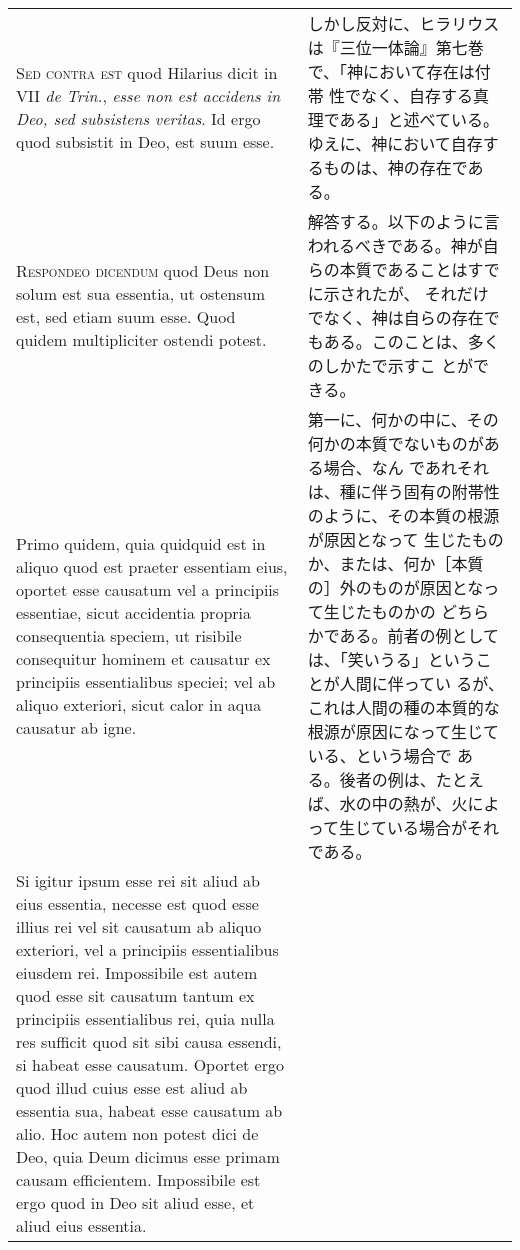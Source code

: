\documentclass[10pt]{jsarticle} %
\begin{document}
\begin{longtable}{p{21em}p{21em}}
\\

\textsc{Sed contra est} quod Hilarius dicit in VII \textit{de Trin.}, \textit{esse non est accidens in Deo, sed subsistens veritas}. 
Id ergo quod subsistit in Deo, est suum esse.

&
しかし反対に、ヒラリウスは『三位一体論』第七巻で、「神において存在は付帯
 性でなく、自存する真理である」と述べている。
ゆえに、神において自存するものは、神の存在である。

\\

\textsc{Respondeo dicendum} quod Deus non solum est sua essentia, ut
 ostensum est, sed etiam suum esse.  Quod quidem multipliciter ostendi
 potest.  

&

解答する。以下のように言われるべきである。神が自らの本質であることはすでに示されたが、
 それだけでなく、神は自らの存在でもある。このことは、多くのしかたで示すこ
 とができる。

\\

Primo quidem, quia quidquid est in aliquo quod est praeter
 essentiam eius, oportet esse causatum vel a principiis essentiae, sicut
 accidentia propria consequentia speciem, ut risibile consequitur
 hominem et causatur ex principiis essentialibus speciei; vel ab aliquo
 exteriori, sicut calor in aqua causatur ab igne.  
&

第一に、何かの中に、その何かの本質でないものがある場合、なん
 であれそれは、種に伴う固有の附帯性のように、その本質の根源が原因となって
 生じたものか、または、何か［本質の］外のものが原因となって生じたものかの
 どちらかである。前者の例としては、「笑いうる」ということが人間に伴ってい
 るが、これは人間の種の本質的な根源が原因になって生じている、という場合で
 ある。後者の例は、たとえば、水の中の熱が、火によって生じている場合がそれ
 である。

\\


Si igitur ipsum esse
 rei sit aliud ab eius essentia, necesse est quod esse illius rei vel
 sit causatum ab aliquo exteriori, vel a principiis essentialibus
 eiusdem rei.  Impossibile est autem quod esse sit causatum tantum ex
 principiis essentialibus rei, quia nulla res sufficit quod sit sibi
 causa essendi, si habeat esse causatum.  Oportet ergo quod illud cuius
 esse est aliud ab essentia sua, habeat esse causatum ab alio.  Hoc
 autem non potest dici de Deo, quia Deum dicimus esse primam causam
 efficientem.  Impossibile est ergo quod in Deo sit aliud esse, et aliud
 eius essentia.


\end{longtable}
\end{document}

